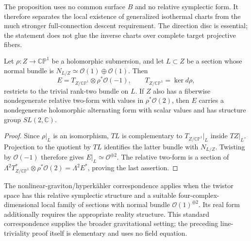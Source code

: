 The proposition uses no common surface $B$ and no relative symplectic
form. It therefore separates the local existence of generalized
isothermal charts from the much stronger full-connection descent
requirement. The direction disc is essential; the statement does not
glue the inverse charts over complete target projective fibers.

\begin{proposition}
Let $\rho:Z\to\mathbb{CP}^1$ be a holomorphic submersion, and let
$L\subset Z$ be a section whose normal bundle is
$N_{L/Z}\simeq\mathcal O(1)\oplus\mathcal O(1)$. Then
\[
E=T_{Z/\mathbb{CP}^1}\otimes\rho^*\mathcal O(-1),
\qquad T_{Z/\mathbb{CP}^1}=\ker d\rho,
\]
restricts to the trivial rank-two bundle on $L$. If $Z$ also has a
fiberwise nondegenerate relative two-form with values in
$\rho^*\mathcal O(2)$, then $E$ carries a nondegenerate holomorphic
alternating form with scalar values and has structure group $SL(2,\mathbb C)$.
\end{proposition}
\begin{proof}
Since $\rho|_L$ is an isomorphism, $TL$ is complementary to
$T_{Z/\mathbb{CP}^1}|_L$ inside $TZ|_L$. Projection to the quotient by
$TL$ identifies the latter bundle with $N_{L/Z}$. Twisting by
$\mathcal O(-1)$ therefore gives $E|_L\simeq\mathcal O^{\oplus2}$.
The relative two-form is a section of
$\Lambda^2T_{Z/\mathbb{CP}^1}^*\otimes\rho^*\mathcal O(2)
=\Lambda^2E^*$, proving the last assertion.
\end{proof}

The nonlinear-graviton/hyperk\"ahler correspondence applies when the
twistor space has this relative symplectic structure and a suitable
four-complex-dimensional local family of sections with normal bundle
$\mathcal O(1)^{\oplus2}$. Its real form additionally requires the
appropriate reality structure. This standard correspondence supplies
the broader gravitational setting; the preceding line-triviality proof
itself is elementary and uses no field equation.

